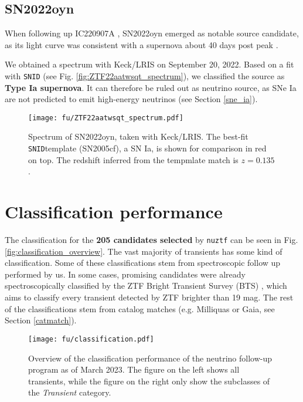 \subsection{SN2022oyn}
When following up IC220907A , SN2022oyn emerged as notable source candidate, as its light curve was consistent with a supernova about 40 days post peak .

We obtained a spectrum with Keck/LRIS on September 20, 2022. Based on a fit with \texttt{SNID} (see Fig. \ref{fig:ZTF22aatwsqt_spectrum}), we classified the source as \textbf{Type Ia supernova}. It can therefore be ruled out as neutrino source, as SNe Ia are not predicted to emit high-energy neutrinos (see Section \ref{sne_ia}).

\begin{figure}[htb]
    \texttt{[image: fu/ZTF22aatwsqt\_spectrum.pdf]}
    \caption[SN2022oyn spectrum]{Spectrum of SN2022oyn, taken with Keck/LRIS. The best-fit \texttt{SNID}template (SN2005cf), a SN Ia, is shown for comparison in red on top. The redshift inferred from the tempmlate match is $z=0.135$.}
\end{figure}

\section{Classification performance} \label{classification_performance}
The classification for the \textbf{205 candidates selected} by \texttt{nuztf} can be seen in Fig. \ref{fig:classification_overview}. The vast majority of transients has some kind of classification. Some of these classifications stem from spectroscopic follow up performed by us. In some cases, promising candidates were already spectroscopically classified by the ZTF Bright Transient Survey (BTS) , which aims to classify every transient detected by ZTF brighter than 19 mag. The rest of the classifications stem from catalog matches (e.g. Milliquas or Gaia, see Section \ref{catmatch}).

\begin{figure*}[t]
    \texttt{[image: fu/classification.pdf]}
    \caption[Follow-up classification overview]{Overview of the classification performance of the neutrino follow-up program as of March 2023. The figure on the left shows all transients, while the figure on the right only show the subclasses of the \textit{Transient} category.}
\end{figure*}

